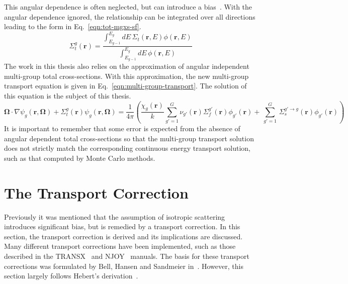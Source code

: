 This angular dependence is often neglected, but can introduce a bias~\cite{gibson-preprint}. With the angular dependence ignored, the relationship can be integrated over all directions leading to the form in Eq.~\ref{eqn:tot-mgxs-sf}.
\begin{equation}
\Sigma_{t}^g(\mathbf{r}) = \frac{\int_{E_{g-1}}^{E_g} dE \, \Sigma_{t}(\mathbf{r},E)\phi(\mathbf{r},E)}{\int_{E_{g-1}}^{E_g} dE \, \phi(\mathbf{r},E)} 
\label{eqn:tot-mgxs-sf}
\end{equation}
The work in this thesis also relies on the approximation of angular independent multi-group total cross-sections. With this approximation, the new multi-group transport equation is given in Eq.~\ref{eqn:multi-group-transport}. The solution of this equation is the subject of this thesis. 
\begin{equation}
\mathbf{\Omega} \cdot \nabla \psi_{g}(\mathbf{r},\mathbf{\Omega}) + \Sigma_t^{g}(\mathbf{r}) \psi_{g}(\mathbf{r},\mathbf{\Omega}) = \frac{1}{4 \pi} \left( \frac{\chi_{g}\left(\mathbf{r}\right)}{k} \sum_{g'=1}^{G} \nu_{g'}\left(\mathbf{r}\right) \Sigma_f^{g'}\left(\mathbf{r}\right) \phi_{g'}\left(\mathbf{r}\right) + \, \sum_{g'=1}^G \,  \Sigma_{s}^{g' \rightarrow g}\left(\mathbf{r}\right) \phi_{g'}(\mathbf{r}) \right)
\label{eqn:multi-group-transport}
\end{equation}
It is important to remember that some error is expected from the absence of angular dependent total cross-sections so that the multi-group transport solution does not strictly match the corresponding continuous energy transport solution, such as that computed by Monte Carlo methods.

\section{The Transport Correction}
\label{sec:transport-correction}

Previously it was mentioned that the assumption of isotropic scattering introduces significant bias, but is remedied by a transport correction. In this section, the transport correction is derived and its implications are discussed. Many different transport corrections have been implemented, such as those described in the TRANSX~\cite{macfarlane1993transx} and NJOY~\cite{macfarlane2000njoy} manuals. The basis for these transport corrections was formulated by Bell, Hansen and Sandmeier in~\cite{bell1967transport}. However, this section largely follows Hebert's derivation~\cite{hebert2009applied}. 

